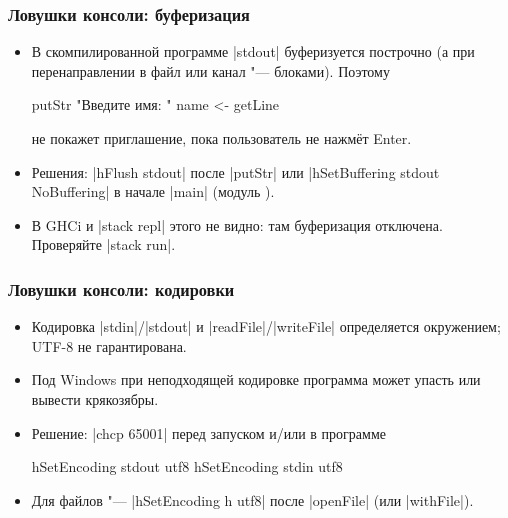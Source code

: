 \documentclass[11pt]{beamer}
\begin{document}
\begin{frame}[fragile]
  \frametitle{Ловушки консоли: буферизация}
  \begin{itemize}
    \item В скомпилированной программе \haskinline|stdout| буферизуется построчно (а при перенаправлении в файл или канал "--- блоками). Поэтому
          \begin{haskell}
            putStr "Введите имя: "
            name <- getLine
          \end{haskell}
          не покажет приглашение, пока пользователь не нажмёт Enter.
          \pause
    \item Решения: \haskinline|hFlush stdout| после \haskinline|putStr| или \haskinline|hSetBuffering stdout NoBuffering| в начале \haskinline|main| (модуль \href{https://hackage.haskell.org/package/base/docs/System-IO.html}{}).
    \item В GHCi и \ghcinline|stack repl| этого не видно: там буферизация отключена. Проверяйте \ghcinline|stack run|.
  \end{itemize}
\end{frame}

\begin{frame}[fragile]
  \frametitle{Ловушки консоли: кодировки}
  \begin{itemize}
    \item Кодировка \haskinline|stdin|/\haskinline|stdout| и \haskinline|readFile|/\haskinline|writeFile| определяется окружением; UTF-8 не гарантирована.
    \item Под Windows при неподходящей кодировке программа может упасть или вывести крякозябры.
          \pause
    \item Решение: \ghcinline|chcp 65001| перед запуском и/или в программе
          \begin{haskell}
            hSetEncoding stdout utf8
            hSetEncoding stdin utf8
          \end{haskell}
    \item Для файлов "--- \haskinline|hSetEncoding h utf8| после \haskinline|openFile| (или \haskinline|withFile|).
  \end{itemize}
\end{frame}
\end{document}
